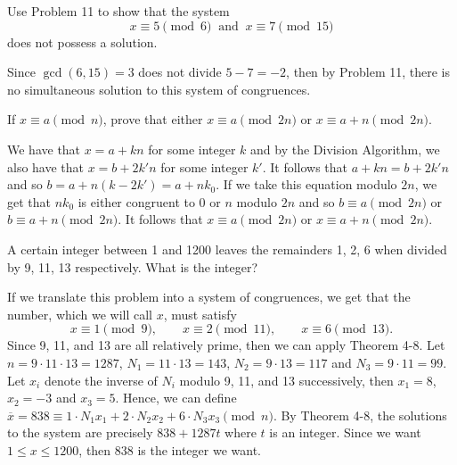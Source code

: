 \begin{exercise}
    Use Problem 11 to show that the system
    $$x \equiv 5 \pmod 6  \ \text{ and } \ x \equiv 7 \pmod{15}$$
    does not possess a solution. \\
\end{exercise}

\begin{solution}
    Since $\gcd(6, 15) = 3$ does not divide $5 - 7 = -2$, then by Problem 11, there is no simultaneous solution to this system of congruences. \\
\end{solution}

\begin{exercise}
    If $x \equiv a \pmod n$, prove that either $x \equiv a \pmod{2n}$ or $x \equiv a + n \pmod{2n}$. \\
\end{exercise}

\begin{solution}
    We have that $x = a + kn$ for some integer $k$ and by the Division Algorithm, we also have that $x = b + 2k'n$ for some integer $k'$. It follows that $a + kn = b + 2k'n$ and so $b = a + n(k - 2k') = a + nk_0$. If we take this equation modulo $2n$, we get that $nk_0$ is either congruent to 0 or $n$ modulo $2n$ and so $b \equiv a \pmod{2n}$ or $b \equiv a + n \pmod{2n}$. It follows that $x \equiv a \pmod{2n}$ or $x \equiv a + n \pmod{2n}$. \\
\end{solution}

\begin{exercise}
    A certain integer between 1 and 1200 leaves the remainders 1, 2, 6 when divided by 9, 11, 13 respectively. What is the integer? \\
\end{exercise}

\begin{solution}
    If we translate this problem into a system of congruences, we get that the number, which we will call $x$, must satisfy
    $$x \equiv 1 \pmod 9, \qquad x \equiv 2 \pmod{11}, \qquad x \equiv 6 \pmod{13}.$$
    Since 9, 11, and 13 are all relatively prime, then we can apply Theorem 4-8. Let $n = 9 \cdot 11 \cdot 13 = 1287$, $N_1 = 11 \cdot 13 = 143$, $N_2 = 9 \cdot 13 = 117$ and $N_3 = 9 \cdot 11 = 99$. Let $x_i$ denote the inverse of $N_i$ modulo 9, 11, and 13 successively, then $x_1 = 8$, $x_2 = -3$ and $x_3 = 5$. Hence, we can define $\overline{x} = 838 \equiv 1 \cdot N_1x_1 + 2 \cdot N_2x_2 + 6 \cdot N_3x_3 \pmod n$. By Theorem 4-8, the solutions to the system are precisely $838 + 1287t$ where $t$ is an integer. Since we want $1 \leq x \leq 1200$, then 838 is the integer we want. \\
\end{solution}

